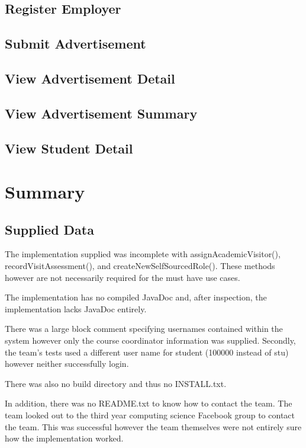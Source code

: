\documentclass[11pt]{l3deliverable}
\begin{document}
\subsection{Register Employer}

\subsection{Submit Advertisement}

\subsection{View Advertisement Detail}

\subsection{View Advertisement Summary}

\subsection{View Student Detail}

\newpage

\section{Summary}

\subsection{Supplied Data}

The implementation supplied was incomplete with assignAcademicVisitor(),
recordVisitAssessment(), and createNewSelfSourcedRole(). These methods however
are not necessarily required for the must have use cases.

The implementation has no compiled JavaDoc and, after inspection, the
implementation lacks JavaDoc entirely.

There was a large block comment specifying usernames contained within the
system however only the course coordinator information was supplied. Secondly,
the team's tests used a different user name for student (100000 instead of
stu) however neither successfully login.

There was also no build directory and thus no INSTALL.txt.

In addition, there was no README.txt to know how to contact the team. The
team looked out to the third year computing science Facebook group to contact
the team. This was successful however the team themselves were not entirely
sure how the implementation worked.
\end{document}
